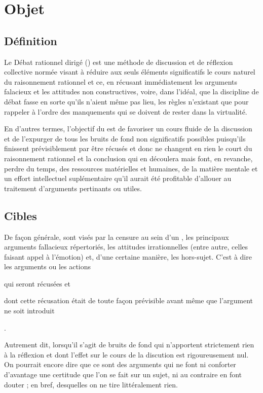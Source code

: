 \section{Objet}

\subsection{Définition}
Le Débat rationnel dirigé (\mainabbr{}) est une méthode de discussion et de réflexion collective normée visant à réduire aux seuls éléments significatifs le cours naturel du raisonnement rationnel et ce, en récusant immédiatement les arguments falacieux et les attitudes non constructives, voire, dans l’idéal, que la discipline de débat fasse en sorte qu’ils n’aient même pas lieu, les règles n’existant que pour rappeler à l’ordre des manquements qui se doivent de rester dans la virtualité.

En d’autres termes, l’objectif du \mainabbr{} est de favoriser un cours fluide de la discussion et de l’expurger de tous les bruits de fond non significatifs possibles puisqu’ils finissent prévisiblement par être récusés et donc ne changent en rien le court du raisonnement rationnel et la conclusion qui en découlera mais font, en revanche, perdre du temps, des ressources matérielles et humaines, de la matière mentale et un effort intellectuel suplémentaire qu’il aurait été profitable d’allouer au traitement d’arguments pertinants ou utiles.

\subsection{Cibles}
De façon générale, sont visés par la censure au sein d’un \mainabbr{}, les principaux arguments fallacieux répertoriés, les attitudes irrationnelles (entre autre, celles faisant appel à l’émotion) et, d’une certaine manière, les hors-sujet. C’est à dire les arguments ou les actions
\begin{SRlist}
	\item qui seront récusées
	et
	\item dont cette récusation était de toute façon prévisible avant même que l’argument ne soit introduit%
\end{SRlist}%
.

Autrement dit, lorsqu’il s’agit de bruits de fond qui n’apportent strictement rien à la réflexion et dont l’effet sur le cours de la discution est rigoureusement nul. On pourrait encore dire que ce sont des arguments qui ne font ni conforter d’avantage une certitude que l’on se fait sur un sujet, ni au contraire en font douter ; en bref, desquelles on ne tire littéralement rien.

